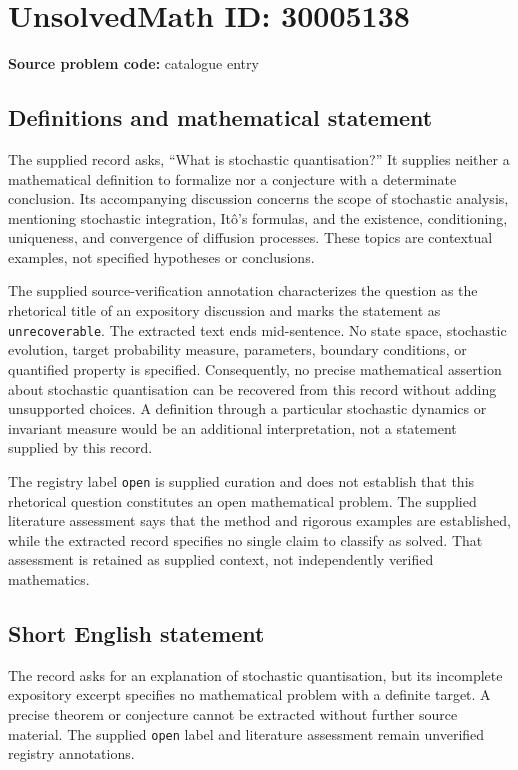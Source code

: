 \documentclass[11pt]{article}
\begin{document}
\section*{UnsolvedMath ID: 30005138}
\textbf{Source problem code:} catalogue entry
\subsection{Definitions and mathematical statement}
The supplied record asks, ``What is stochastic quantisation?'' It supplies neither a mathematical definition to formalize nor a conjecture with a determinate conclusion. Its accompanying discussion concerns the scope of stochastic analysis, mentioning stochastic integration, It\^o's formulas, and the existence, conditioning, uniqueness, and convergence of diffusion processes. These topics are contextual examples, not specified hypotheses or conclusions.

The supplied source-verification annotation characterizes the question as the rhetorical title of an expository discussion and marks the statement as \texttt{unrecoverable}. The extracted text ends mid-sentence. No state space, stochastic evolution, target probability measure, parameters, boundary conditions, or quantified property is specified. Consequently, no precise mathematical assertion about stochastic quantisation can be recovered from this record without adding unsupported choices. A definition through a particular stochastic dynamics or invariant measure would be an additional interpretation, not a statement supplied by this record.

The registry label \texttt{open} is supplied curation and does not establish that this rhetorical question constitutes an open mathematical problem. The supplied literature assessment says that the method and rigorous examples are established, while the extracted record specifies no single claim to classify as solved. That assessment is retained as supplied context, not independently verified mathematics.
\subsection{Short English statement}
The record asks for an explanation of stochastic quantisation, but its incomplete expository excerpt specifies no mathematical problem with a definite target. A precise theorem or conjecture cannot be extracted without further source material. The supplied \texttt{open} label and literature assessment remain unverified registry annotations.
\end{document}
